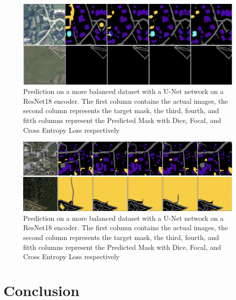 \documentclass[conference]{IEEEtran}
\begin{document}
\begin{figure}
    \includegraphics[]{images/roads-losses/roads-smaller.png}
    \caption{Prediction on a more balanced dataset with a U-Net network on a ResNet18 encoder. The first column contains the actual images, the second column represents the target mask, the third, fourth, and fitth columns represent the Predicted Mask with Dice, Focal, and Cross Entropy Loss respectively}
\end{figure}

\begin{figure}
    \includegraphics[width=\textwidth]{images/encoders/encoders-vis.png}
    \caption{Prediction on a more balanced dataset with a U-Net network on a ResNet18 encoder. The first column contains the actual images, the second column represents the target mask, the third, fourth, and fitth columns represent the Predicted Mask with Dice, Focal, and Cross Entropy Loss respectively}
\end{figure}
\section{Conclusion}
\end{document}
